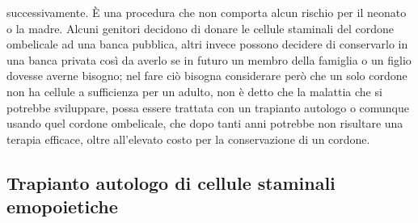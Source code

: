 successivamente. È una procedura che non comporta alcun rischio per il neonato o la madre. 
Alcuni genitori decidono di donare le cellule staminali del cordone ombelicale ad una banca pubblica, altri invece 
possono decidere di conservarlo in una banca privata così da averlo se in futuro un membro della famiglia o un figlio 
dovesse averne bisogno; nel fare ciò bisogna considerare però che un solo cordone non ha cellule a sufficienza per un 
adulto, non è detto che la malattia che si potrebbe sviluppare, possa essere trattata con un trapianto autologo o 
comunque usando quel cordone ombelicale, che dopo tanti anni potrebbe non risultare una terapia efficace, oltre 
all’elevato costo per la conservazione di un cordone\cite{STEMCELLS}.\\

\subsection{Trapianto autologo di cellule staminali emopoietiche}

